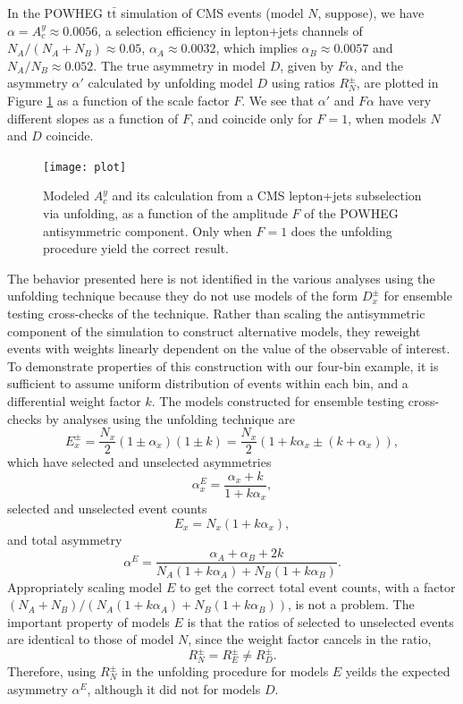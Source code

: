 \documentclass[letterpaper,11pt]{article}
\begin{document}
In the {\sc POWHEG} $\mathrm{t\bar{t}}$ simulation of CMS events
(model $N$, suppose), we have $\alpha=A_c^y\approx0.0056$, a selection
efficiency in lepton+jets channels of $N_A/(N_A+N_B)\approx 0.05$,
$\alpha_A\approx0.0032$, which implies $\alpha_B\approx0.0057$ and
$N_A/N_B\approx0.052$.  The true asymmetry in model $D$, given by
$F\alpha$, and the asymmetry $\alpha'$ calculated by unfolding model
$D$ using ratios $R_N^\pm$, are plotted in Figure \ref{plot} as a
function of the scale factor $F$.  We see that $\alpha'$ and $F\alpha$
have very different slopes as a function of $F$, and coincide only for
$F=1$, when models $N$ and $D$ coincide.
\begin{figure}
  \centering
  \texttt{[image: plot]}
  \caption{\label{plot} Modeled $A_c^y$ and its calculation from a CMS
    lepton+jets subselection via unfolding, as a function of the
    amplitude $F$ of the {\sc POWHEG} antisymmetric component.  Only
    when $F=1$ does the unfolding procedure yield the correct result.}
\end{figure}

The behavior presented here is not identified in the various analyses
using the unfolding technique because they do not use models of the
form $D_x^\pm$ for ensemble testing cross-checks of the technique.
Rather than scaling the antisymmetric component of the simulation to
construct alternative models, they reweight events with weights
linearly dependent on the value of the observable of interest.  To
demonstrate properties of this construction with our four-bin example,
it is sufficient to assume uniform distribution of events within each
bin, and a differential weight factor $k$.  The models constructed for
ensemble testing cross-checks by analyses using the unfolding
technique are
\[E_x^\pm = \frac{N_x}{2}(1\pm\alpha_x)(1\pm k) = \frac{N_x}{2}(1+k\alpha_x\pm(k+\alpha_x)),\]
which have selected and unselected asymmetries
\[\alpha^E_x = \frac{\alpha_x+k}{1+k\alpha_x},\]
selected and unselected event counts
\[E_x = N_x(1+k\alpha_x),\]
and total asymmetry
\[\alpha^E = \frac{\alpha_A+\alpha_B+2k}{N_A(1+k\alpha_A)+N_B(1+k\alpha_B)}.\]
Appropriately scaling model $E$ to get the correct total event counts,
with a factor $(N_A+N_B)/(N_A(1+k\alpha_A)+N_B(1+k\alpha_B))$, is not
a problem.  The important property of models $E$ is that the ratios of
selected to unselected events are identical to those of model $N$,
since the weight factor cancels in the ratio,
\[R^\pm_N = R^\pm_E \ne R^\pm_D.\]
Therefore, using $R^\pm_N$ in the unfolding procedure for models $E$
yeilds the expected asymmetry $\alpha^E$, although it did not for
models $D$.
\end{document}
